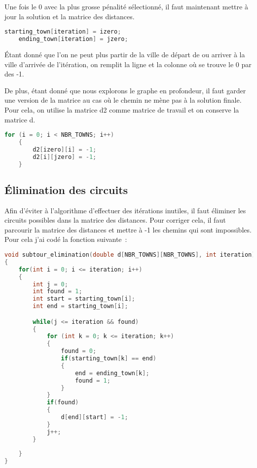 \documentclass[11pt]{article}
\begin{document}
Une fois le 0 avec la plus grosse pénalité sélectionné, il faut maintenant mettre à jour la solution et la matrice des distances.

\begin{lstlisting}[language=C]
    starting_town[iteration] = izero;
    ending_town[iteration] = jzero;
\end{lstlisting}

Étant donné que l'on ne peut plus partir de la ville de départ de ou arriver à la ville d'arrivée de l'itération, on remplit la ligne et la colonne où se trouve le 0 par des -1.

De plus, étant donné que nous explorons le graphe en profondeur, il faut garder une version de la matrice au cas où le chemin ne mène pas à la solution finale. Pour cela, on utilise la matrice d2 comme matrice de travail et on conserve la matrice d.

\begin{lstlisting}[language=C]
    for (i = 0; i < NBR_TOWNS; i++)
    {
        d2[izero][i] = -1;
        d2[i][jzero] = -1;
    }
\end{lstlisting}

\subsection{Élimination des circuits}

Afin d'éviter à l'algorithme d'effectuer des itérations inutiles, il faut éliminer les circuits possibles dans la matrice des distances.
Pour corriger cela, il faut parcourir la matrice des distances et mettre à -1 les chemins qui sont impossibles. Pour cela j'ai codé la fonction suivante :

\begin{lstlisting}[language=c]
void subtour_elimination(double d[NBR_TOWNS][NBR_TOWNS], int iteration)
{
    for(int i = 0; i <= iteration; i++)
    {
        int j = 0;
        int found = 1;
        int start = starting_town[i];
        int end = starting_town[i];

        while(j <= iteration && found)
        {
            for (int k = 0; k <= iteration; k++)
            {
                found = 0;
                if(starting_town[k] == end)
                {
                    end = ending_town[k];
                    found = 1;
                }
            }
            if(found)
            {
                d[end][start] = -1;
            }
            j++;
        }
        
    }
}
\end{lstlisting}
\end{document}

